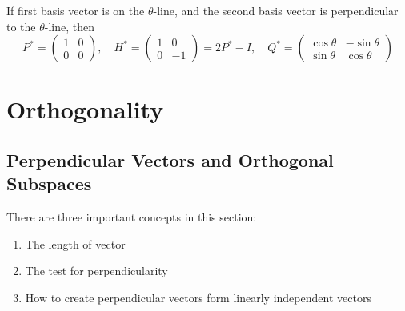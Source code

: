 \begin{note}
    If first basis vector is on the $\theta$-line, and the second basis vector is perpendicular to the $\theta$-line, then
    \[
        P^* = \begin{pmatrix}
            1 & 0 \\
            0 & 0
        \end{pmatrix}, \quad H^* = \begin{pmatrix}
            1 & 0 \\
            0 & -1
        \end{pmatrix} = 2P^* - I, \quad Q^* = \begin{pmatrix}
            \cos \theta & -\sin \theta \\
            \sin \theta & \cos \theta   
        \end{pmatrix}
    \]
\end{note}

\newpage

\chapter{Orthogonality}
\section{Perpendicular Vectors and Orthogonal Subspaces}

There are three important concepts in this section:
\begin{enumerate}[label=(\roman*)]
    \item The length of vector
    \item The test for perpendicularity
    \item How to create perpendicular vectors form linearly independent vectors
\end{enumerate}

